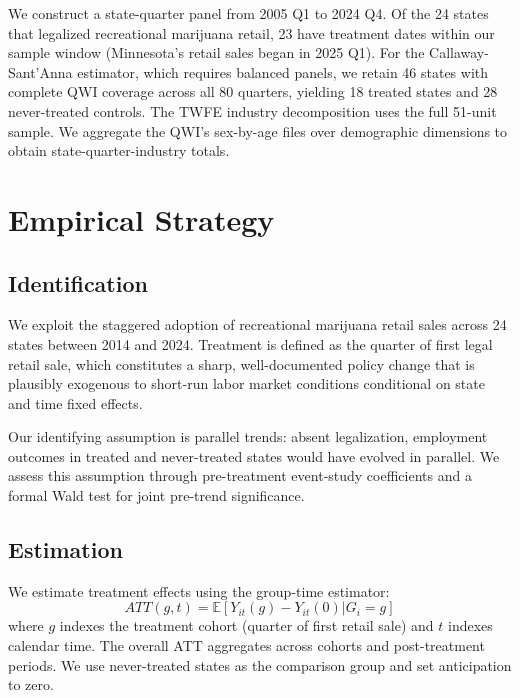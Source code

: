 \documentclass[12pt]{article}
\newcommand{\E}{\mathbb{E}}
\begin{document}
We construct a state-quarter panel from 2005 Q1 to 2024 Q4. Of the 24 states that legalized recreational marijuana retail, 23 have treatment dates within our sample window (Minnesota's retail sales began in 2025 Q1). For the Callaway-Sant'Anna estimator, which requires balanced panels, we retain 46 states with complete QWI coverage across all 80 quarters, yielding 18 treated states and 28 never-treated controls. The TWFE industry decomposition uses the full 51-unit sample. We aggregate the QWI's sex-by-age files over demographic dimensions to obtain state-quarter-industry totals.



\section{Empirical Strategy}

\subsection{Identification}

We exploit the staggered adoption of recreational marijuana retail sales across 24 states between 2014 and 2024. Treatment is defined as the quarter of first legal retail sale, which constitutes a sharp, well-documented policy change that is plausibly exogenous to short-run labor market conditions conditional on state and time fixed effects.

Our identifying assumption is parallel trends: absent legalization, employment outcomes in treated and never-treated states would have evolved in parallel. We assess this assumption through pre-treatment event-study coefficients and a formal Wald test for joint pre-trend significance.

\subsection{Estimation}

We estimate treatment effects using the \citet{callaway2021} group-time estimator:
\begin{equation}
ATT(g,t) = \E[Y_{it}(g) - Y_{it}(0) | G_i = g]
\end{equation}
where $g$ indexes the treatment cohort (quarter of first retail sale) and $t$ indexes calendar time. The overall ATT aggregates across cohorts and post-treatment periods. We use never-treated states as the comparison group and set anticipation to zero.
\end{document}
